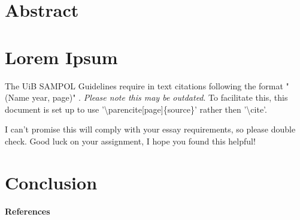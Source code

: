 \documentclass[12pt]{article}
\begin{document}

\section{Abstract}
\section{Lorem Ipsum}
    The UiB SAMPOL Guidelines require in text citations following the format "(Name year, page)" \parencite[1,4]{Source}. \textit{Please note this may be outdated}. To facilitate this, this document is set up to use '\textbackslash parencite[page]\{source\}' rather then '\textbackslash cite'.


    I can't promise this will comply with your essay requirements, so please double check. Good luck on your assignment, I hope you found this helpful! 
    
\section{Conclusion}

\newpage
\textbf{References}
\printbibliography
\end{document}
